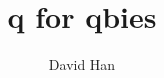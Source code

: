\documentclass[a4paper,twoside]{scrbook}
\begin{document}
\title{q for qbies}
\author{David Han}
\frontmatter
\maketitle
\setcounter{tocdepth}{1}
\tableofcontents
\mainmatter





\end{document}
